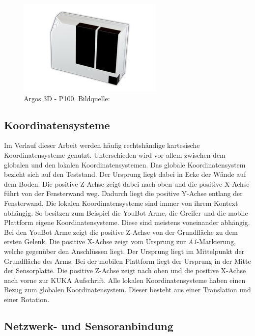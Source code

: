 \begin{figure}[H]
	\centering
	\includegraphics[scale=0.8]{fig/argos3d}   
	\caption[Argos 3D - P100]{Argos 3D - P100. Bildquelle: \cite{bluetechnix2015}}
	\label{fig:aufbau-argos3d}
\end{figure}

\subsection{Koordinatensysteme}
Im Verlauf dieser Arbeit werden häufig rechtshändige kartesische Koordinatensysteme genutzt. Unterschieden wird vor allem zwischen dem globalen und den lokalen Koordinatensystemen. Das globale Koordinatensystem bezieht sich auf den Teststand. Der Ursprung liegt dabei in Ecke der Wände auf dem Boden. Die positive Z-Achse zeigt dabei nach oben und die positive X-Achse führt von der Fensterwand weg. Dadurch liegt die positive Y-Achse entlang der Fensterwand. Die lokalen Koordinatensysteme sind immer von ihrem Kontext abhängig. So besitzen zum Beispiel die YouBot Arme, die Greifer und die mobile Plattform eigene Koordinatensysteme. Diese sind meistens voneinander abhängig. Bei den YouBot Arme zeigt die positive Z-Achse von der Grundfläche zu dem ersten Gelenk. Die positive X-Achse zeigt vom Ursprung zur \textit{A1}-Markierung, welche gegenüber den Anschlüssen liegt. Der Ursprung liegt im Mittelpunkt der Grundfläche des Arms. Bei der mobilen Plattform liegt der Ursprung in der Mitte der Sensorplatte. Die positive Z-Achse zeigt nach oben und die positive X-Achse nach vorne zur KUKA Aufschrift. Alle lokalen Koordinatensysteme haben einen Bezug zum globalen Koordinatensystem. Dieser besteht aus einer Translation und einer Rotation.

\subsection{Netzwerk- und Sensoranbindung}

